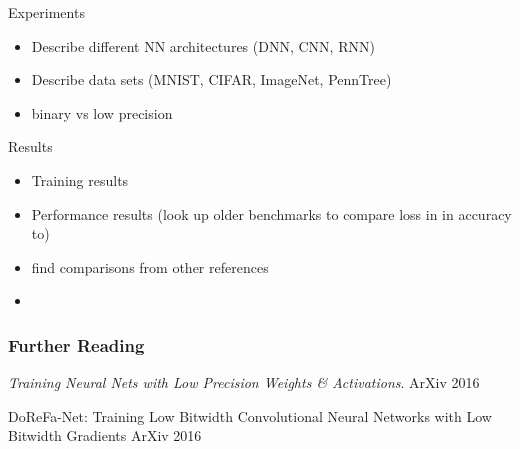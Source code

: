 \documentclass{beamer}
\begin{document}
\begin{frame}{Experiments}
    \begin{itemize}
        \item Describe different NN architectures (DNN, CNN, RNN)
        \item Describe data sets (MNIST, CIFAR, ImageNet, PennTree)
        \item binary vs low precision
    \end{itemize}
\end{frame}

\begin{frame}{Results}
    \begin{itemize}
        \item Training results
        \item Performance results (look up older benchmarks to compare loss in
        in accuracy to)
        \item find comparisons from other references
    \end{itemize}
\end{frame}

\begin{frame}{}
    \begin{itemize}
        \item 
    \end{itemize}
\end{frame}

\begin{frame}[allowframebreaks]
  \frametitle<presentation>{Further Reading}    
  \begin{thebibliography}{8}

  \beamertemplatearticlebibitems
    {\em Training Neural Nets with Low Precision Weights \& Activations}.
    \newblock ArXiv 2016

  \beamertemplatearticlebibitems
    {DoReFa-Net: Training Low Bitwidth Convolutional Neural Networks with Low
    Bitwidth Gradients}
    \newblock ArXiv 2016

  \end{thebibliography}
\end{frame}
\end{document}
